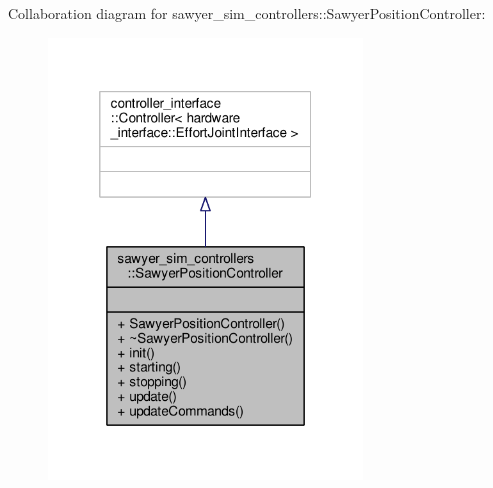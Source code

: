 Collaboration diagram for sawyer\-\_\-sim\-\_\-controllers\-:\-:Sawyer\-Position\-Controller\-:\nopagebreak
\begin{figure}[H]
\begin{center}
\leavevmode
\includegraphics[width=236pt]{classsawyer__sim__controllers_1_1_sawyer_position_controller__coll__graph}
\end{center}
\end{figure}
